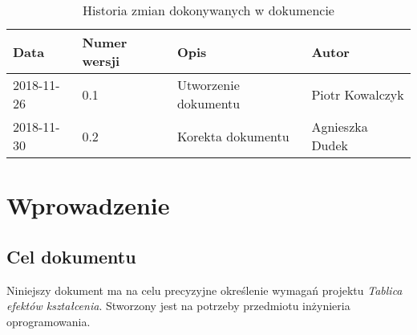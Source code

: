 \documentclass{article}
\begin{document}
\begin{titlepage}






\end{titlepage}

\addtocounter{page}{1}
\newpage

\begin{table}[h!]
	\begin{center}
		\caption{Historia zmian dokonywanych w dokumencie}
		\begin{tabular}{|l|l|l|l|}
			\hline
			Data & Numer wersji & Opis & Autor \\
			\hline \hline
			2018-11-26 & 0.1 & Utworzenie dokumentu & Piotr Kowalczyk \\
			\hline 
			2018-11-30 & 0.2 & Korekta dokumentu & Agnieszka Dudek \\
			\hline
    \end{tabular}
	\end{center}
\end{table}	

\tableofcontents

\newpage


\section{Wprowadzenie}

\subsection{Cel dokumentu}
Niniejszy dokument ma na celu precyzyjne określenie wymagań projektu \textit{Tablica efektów kształcenia}. Stworzony jest na potrzeby przedmiotu inżynieria oprogramowania.
\end{document}
